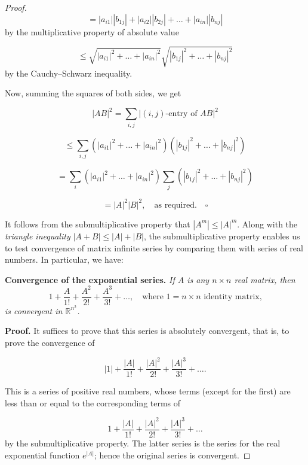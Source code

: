 \documentclass[11pt,a4paper]{article}
\theoremstyle{definition}
\numberwithin{equation}{section}
\begin{document}
\begin{proof}
\begin{equation*}
= |a_{i1}||b_{1j}| + |a_{i2}||b_{2j}| + \dots + |a_{in}||b_{nj}|
\end{equation*}
by the multiplicative property of absolute value

\begin{equation*}
\leq \sqrt{|a_{i1}|^2 + \dots + |a_{in}|^2} \sqrt{|b_{1j}|^2 + \dots + |b_{nj}|^2}
\end{equation*}
by the Cauchy–Schwarz inequality.

Now, summing the squares of both sides, we get

\begin{equation*}
|AB|^2 = \sum_{i,j} |(i,j)\text{-entry of } AB|^2
\end{equation*}

\begin{equation*}
\leq \sum_{i,j} (|a_{i1}|^2 + \dots + |a_{in}|^2)(|b_{1j}|^2 + \dots + |b_{nj}|^2)
\end{equation*}

\begin{equation*}
= \sum_{i} (|a_{i1}|^2 + \dots + |a_{in}|^2) \sum_{j} (|b_{1j}|^2 + \dots + |b_{nj}|^2)
\end{equation*}

\begin{equation*}
= |A|^2 |B|^2, \quad \text{as required.} \quad \square
\end{equation*}

It follows from the submultiplicative property that \( |A^m| \leq |A|^m \). Along with the \textit{triangle inequality} \( |A + B| \leq |A| + |B| \), the submultiplicative property enables us to test convergence of matrix infinite series by comparing them with series of real numbers. In particular, we have:

\textbf{Convergence of the exponential series.} \textit{If \( A \) is any \( n \times n \) real matrix, then}
\begin{equation*}
1 + \frac{A}{1!} + \frac{A^2}{2!} + \frac{A^3}{3!} + \dots, \quad \text{where } 1 = n \times n \text{ identity matrix,}
\end{equation*}
\textit{is convergent in \( \mathbb{R}^{n^2} \).}

\textbf{Proof.} It suffices to prove that this series is absolutely convergent, that is, to prove the convergence of

\begin{equation*}
|1| + \frac{|A|}{1!} + \frac{|A|^2}{2!} + \frac{|A|^3}{3!} + \dots.
\end{equation*}

This is a series of positive real numbers, whose terms (except for the first) are less than or equal to the corresponding terms of

\begin{equation*}
1 + \frac{|A|}{1!} + \frac{|A|^2}{2!} + \frac{|A|^3}{3!} + \dots
\end{equation*}
by the submultiplicative property. The latter series is the series for the real exponential function \( e^{|A|} \); hence the original series is convergent.
\end{proof}
\end{document}
